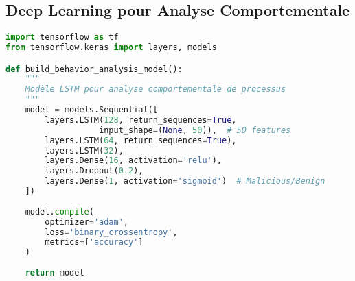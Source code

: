 \subsection{Deep Learning pour Analyse Comportementale}
\begin{lstlisting}[language=Python, caption=Modèle LSTM pour analyse comportementale]
import tensorflow as tf
from tensorflow.keras import layers, models

def build_behavior_analysis_model():
    """
    Modèle LSTM pour analyse comportementale de processus
    """
    model = models.Sequential([
        layers.LSTM(128, return_sequences=True, 
                   input_shape=(None, 50)),  # 50 features
        layers.LSTM(64, return_sequences=True),
        layers.LSTM(32),
        layers.Dense(16, activation='relu'),
        layers.Dropout(0.2),
        layers.Dense(1, activation='sigmoid')  # Malicious/Benign
    ])
    
    model.compile(
        optimizer='adam',
        loss='binary_crossentropy',
        metrics=['accuracy']
    )
    
    return model
\end{lstlisting}